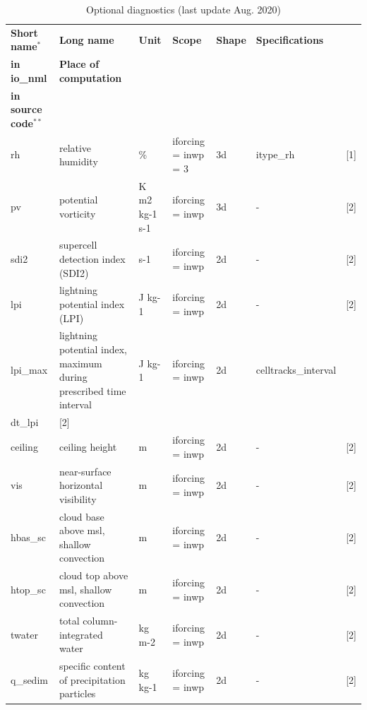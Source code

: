 \renewcommand*{\arraystretch}{1.2}
\begin{longtable}
{|>{\raggedright}p{}  %
|>{\raggedright}p{}   %
|>{\raggedright}p{}   %
|>{\raggedright}p{}    %
|>{\raggedright}p{}   %
|>{\raggedright}p{}   %
|>{\raggedright}p{}|} %
\caption{Optional diagnostics (last update Aug. 2020)}\label{tab:optionaldiagnostics}\\
\hline
\textbf{Short name}${}^\ast$ & \textbf{Long name} & \textbf{Unit} & \textbf{Scope} & \textbf{Shape} &
\textbf{Specifications}\\\textbf{in io\_nml} & \textbf{Place of computation} \\ \textbf{in source code}${}^{\ast\ast}$
\tabularnewline
\hline
\endhead

rh & relative humidity & \% & iforcing = inwp = 3 & 3d & itype\_rh & [1]
\tabularnewline
%

pv & potential vorticity & K m2 kg-1 s-1 & iforcing = inwp & 3d & - & [2]
\tabularnewline
%

sdi2 & supercell detection index (SDI2) & s-1 & iforcing = inwp & 2d & - & [2]
\tabularnewline
%

lpi & lightning potential index (LPI) & J kg-1 & iforcing = inwp & 2d & - & [2]
\tabularnewline
%

lpi\_max & lightning potential index, maximum during prescribed time interval & J kg-1 & iforcing = inwp & 2d &
celltracks\_interval \\ dt\_lpi & [2]
\tabularnewline
%

ceiling & ceiling height & m & iforcing = inwp & 2d & - &  [2]
\tabularnewline
%

vis & near-surface horizontal visibility & m & iforcing = inwp & 2d & - &  [2]
\tabularnewline
%

hbas\_sc & cloud base above msl, shallow convection & m & iforcing = inwp & 2d & - & [2]
\tabularnewline
%

htop\_sc & cloud top above msl, shallow convection & m & iforcing = inwp & 2d & - & [2]
\tabularnewline
%

twater & total column-integrated water & kg m-2 & iforcing = inwp & 2d & - & [2]
\tabularnewline
%

q\_sedim & specific content of precipitation particles & kg kg-1 & iforcing = inwp & 2d & - & [2]
\tabularnewline
%


\end{longtable}
